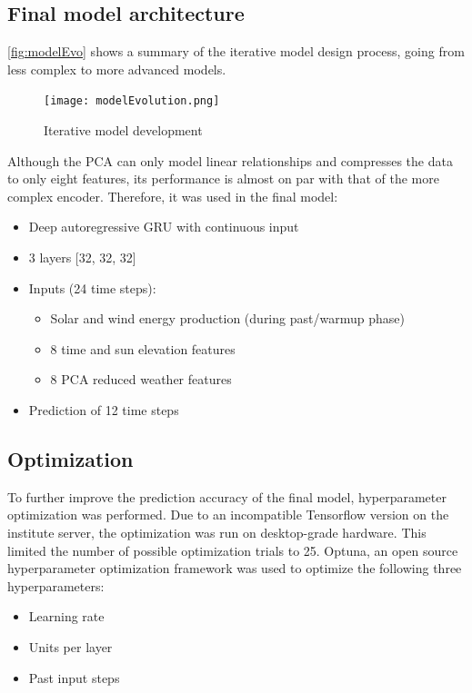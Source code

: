 \documentclass[11pt,table]{article}
\begin{document}
\subsection{Final model architecture}

\autoref{fig:modelEvo} shows a summary of the iterative model design process, going from less complex to more advanced models.

\begin{figure}[ht]
	\centering
	\texttt{[image: modelEvolution.png]}
	\caption{Iterative model development}
	\label{fig:modelEvo}
\end{figure}

Although the \ac{PCA} can only model linear relationships and compresses the data to only eight features, its performance is almost on par with that of the more complex encoder. Therefore, it was used in the final model:
\begin{itemize}
\item Deep autoregressive \ac{GRU} with continuous input
\item 3 layers [32, 32, 32]
\item Inputs (24 time steps):
\begin{itemize}
\item Solar and wind energy production (during past/warmup phase)
\item 8 time and sun elevation features
\item 8 \ac{PCA} reduced weather features
\end{itemize}
\item Prediction of 12 time steps 
\end{itemize}

\subsection{Optimization}
To further improve the prediction accuracy of the final model, hyperparameter optimization was performed. Due to an incompatible Tensorflow version on the institute server, the optimization was run on desktop-grade hardware. This limited the number of possible optimization trials to 25. Optuna, an open source hyperparameter optimization framework was used to optimize the following three hyperparameters: 
\begin{itemize}
\item Learning rate
\item Units per layer
\item Past input steps
\end{itemize}
\end{document}
